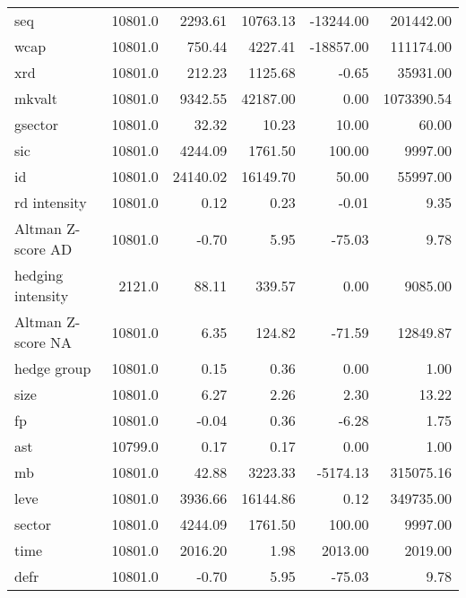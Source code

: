 \begin{tabular}{lrrrrr}
seq               &  10801.0 &   2293.61 &  10763.13 & -13244.00 &   201442.00 \\
wcap              &  10801.0 &    750.44 &   4227.41 & -18857.00 &   111174.00 \\
xrd               &  10801.0 &    212.23 &   1125.68 &     -0.65 &    35931.00 \\
mkvalt            &  10801.0 &   9342.55 &  42187.00 &      0.00 &  1073390.54 \\
gsector           &  10801.0 &     32.32 &     10.23 &     10.00 &       60.00 \\
sic               &  10801.0 &   4244.09 &   1761.50 &    100.00 &     9997.00 \\
id                &  10801.0 &  24140.02 &  16149.70 &     50.00 &    55997.00 \\
rd intensity      &  10801.0 &      0.12 &      0.23 &     -0.01 &        9.35 \\
Altman Z-score AD &  10801.0 &     -0.70 &      5.95 &    -75.03 &        9.78 \\
hedging intensity &   2121.0 &     88.11 &    339.57 &      0.00 &     9085.00 \\
Altman Z-score NA &  10801.0 &      6.35 &    124.82 &    -71.59 &    12849.87 \\
hedge group       &  10801.0 &      0.15 &      0.36 &      0.00 &        1.00 \\
size              &  10801.0 &      6.27 &      2.26 &      2.30 &       13.22 \\
fp                &  10801.0 &     -0.04 &      0.36 &     -6.28 &        1.75 \\
ast               &  10799.0 &      0.17 &      0.17 &      0.00 &        1.00 \\
mb                &  10801.0 &     42.88 &   3223.33 &  -5174.13 &   315075.16 \\
leve              &  10801.0 &   3936.66 &  16144.86 &      0.12 &   349735.00 \\
sector            &  10801.0 &   4244.09 &   1761.50 &    100.00 &     9997.00 \\
time              &  10801.0 &   2016.20 &      1.98 &   2013.00 &     2019.00 \\
defr              &  10801.0 &     -0.70 &      5.95 &    -75.03 &        9.78 \\
\bottomrule
\end{tabular}

